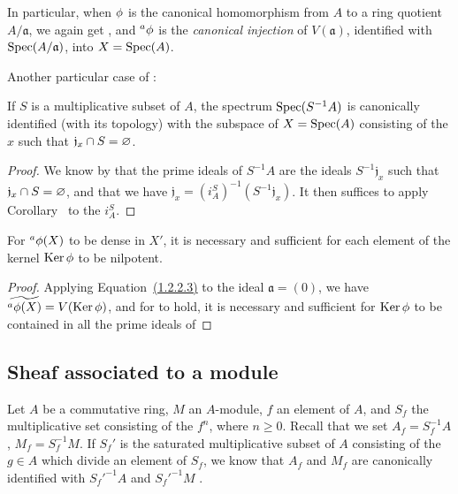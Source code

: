 \begin{env}[1.2.5]
\label{I.1.2.5}
In particular, when $\phi$ is the canonical homomorphism from $A$ to a ring quotient $A/\mathfrak{a}$, we again get , and ${}^a\phi$ is the \emph{canonical injection} of $V(\mathfrak{a})$, identified with $\operatorname{Spec}(A/\mathfrak{a})$, into $X=\operatorname{Spec}(A)$.
\end{env}

Another particular case of :
\begin{corollary}[1.2.6]
\label{I.1.2.6}
If $S$ is a multiplicative subset of $A$, the spectrum $\operatorname{Spec}(S^{-1}A)$ is canonically identified (with its topology) with the subspace of $X=\operatorname{Spec}(A)$ consisting of the $x$ such that $\mathfrak{j}_x\cap S=\varnothing$.
\end{corollary}

\begin{proof}
We know by  that the prime ideals of $S^{-1}A$ are the ideals $S^{-1}\mathfrak{j}_x$ such that $\mathfrak{j}_x\cap S=\varnothing$, and that we have $\mathfrak{j}_x=(i_A^S)^{-1}(S^{-1}\mathfrak{j}_x)$.
It then suffices to apply Corollary~ to the $i_A^S$.
\end{proof}

\begin{corollary}[1.2.7]
\label{I.1.2.7}
For ${}^a\phi(X)$ to be dense in $X'$, it is necessary and sufficient for each element of the kernel $\operatorname{Ker}\phi$ to be nilpotent.
\end{corollary}

\begin{proof}
Applying Equation~\hyperref[I.1.2.2]{(1.2.2.3)} to the ideal $\mathfrak{a}=(0)$, we have $\widetilde{{}^a\phi(X)}=V(\operatorname{Ker}\phi)$, and for  to hold, it is necessary and sufficient for $\operatorname{Ker}\phi$ to be contained in all the prime ideals of 
\end{proof}

\subsection{Sheaf associated to a module}
\label{subsection:I.1.3}

\begin{env}[1.3.1]
\label{I.1.3.1}
Let $A$ be a commutative ring, $M$ an $A$-module, $f$ an element of $A$, and $S_f$ the multiplicative set consisting of the $f^n$, where $n\geq 0$.
Recall that we set $A_f=S_f^{-1}A$, $M_f=S_f^{-1}M$.
If $S_f'$ is the saturated multiplicative subset of $A$ consisting of the $g\in A$ which divide an element of $S_f$, we know that $A_f$ and $M_f$ are canonically identified with ${S_f'}^{-1}A$ and ${S_f'}^{-1}M$ .
\end{env}


